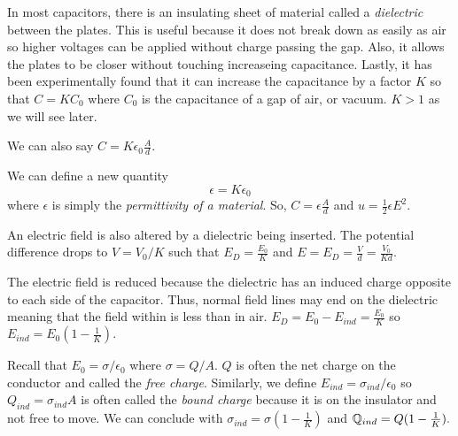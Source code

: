 \begin{definition}[Dielectric]
    In most capacitors, there is an insulating sheet of material called a \emph{dielectric} between the plates. This is useful because it does not break down as easily as air so higher voltages can be applied without charge passing the gap. Also, it allows the plates to be closer without touching increaseing capacitance. Lastly, it has been experimentally found that it can increase the capacitance by a factor $K$ so that $C = KC_0$ where $C_0$ is the capacitance of a gap of air, or vacuum. $K >1$ as we will see later.
\end{definition}
\begin{remark}
    We can also say $C = K\epsilon_0\frac{A}{d}$.
\end{remark}
\begin{definition}[Permittivity]
    We can define a new quantity $$\epsilon = K\epsilon_0$$ where $\epsilon$ is simply the \emph{permittivity of a material}. So, $C = \epsilon\frac{A}{d}$ and $u = \frac{1}{2}\epsilon E^2$.
\end{definition}
\begin{remark}
    An electric field is also altered by a dielectric being inserted. The potential difference drops to $V = V_0/K$ such that $E_D = \frac{E_0}{K}$ and $E = E_D=\frac{V}{d}=\frac{V_0}{Kd}.$

    The electric field is reduced because the dielectric has an induced charge opposite to each side of the capacitor. Thus, normal field lines may end on the dielectric meaning that the field within is less than in air. $E_D = E_0 - E_{ind} = \frac{E_0}{K}$ so $E_{ind}=E_0(1-\frac{1}{K}).$
\end{remark}
\begin{definition}
    Recall that $E_0 = \sigma/\epsilon_0$ where $\sigma = Q/A$. $Q$ is often the net charge on the conductor and called the \emph{free charge}. Similarly, we define $E_{ind} = \sigma_{ind}/\epsilon_0$ so $Q_{ind} = \sigma_{ind}A$ is often called the \emph{bound charge} because it is on the insulator and not free to move. We can conclude with $\sigma_{ind} = \sigma(1-\frac{1}{K})$ and $\mathbb{Q}_{ind} = Q(1-\frac{1}{K}).$
\end{definition}